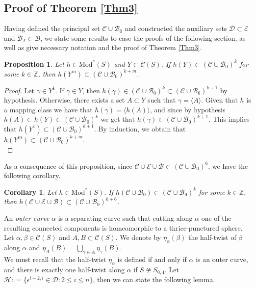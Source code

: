 \documentclass[twoside,11pt,a4paper]{article}
\newtheorem{Prop}[Def]{Proposition}
\newtheorem{Cor}[Def]{Corollary}
\newcommand*{\ccomp}[1]{\mathcal{C}(#1)}
\newcommand*{\EMod}[1]{\mathrm{Mod}^{*}(#1)}
\newcommand*{\Cf}{\mathscr{C}}
\newcommand*{\Bf}{\mathscr{B}}
\newcommand*{\Df}{\mathscr{D}}
\newcommand*{\Ef}{\mathscr{E}}
\newcommand*{\Hff}{\mathscr{H}}
\newcommand*{\ColonEqq}{\mathrel{\mathop:}=}
\begin{document}
\subsection{Proof of Theorem \ref{Thm3}}\label{chap2sec3}
\indent Having defined the principal set $\Cf \cup \Bf_{0}$ and constructed the auxiliary sets $\Df \subset \Ef$ and $\Bf_{T} \subset \Bf$, we state some results to ease the proofs of the following section, as well as give necessary notation and the proof of Theorem \ref{Thm3}.
\begin{Prop}\label{OnlyCUB0}
 Let $h \in \EMod{S}$ and $Y \subset \ccomp{S}$. If $h(Y) \subset (\Cf \cup \Bf_{0})^{k}$ for some $k \in \mathbb{Z}$, then $h(Y^{m}) \subset (\Cf \cup \Bf_{0})^{k+m}$.
\end{Prop}
\begin{proof}
 Let $\gamma \in Y^{1}$. If $\gamma \in Y$, then $h(\gamma) \in (\Cf \cup \Bf_{0})^{k} \subset (\Cf \cup \Bf_{0})^{k+1}$ by hypothesis. Otherwise, there exists a set $A \subset Y$ such that $\gamma = \langle A \rangle$. Given that $h$ is a mapping class we have that $h(\gamma) = \langle h(A) \rangle$, and since by hypothesis $h(A) \subset h(Y) \subset (\Cf \cup \Bf_{0})^{k}$ we get that $h(\gamma) \in (\Cf \cup \Bf_{0})^{k+1}$. This implies that $h(Y^{1}) \subset (\Cf \cup \Bf_{0})^{k+1}$. By induction, we obtain that $h(Y^{m}) \subset (\Cf \cup \Bf_{0})^{k+m}$.\\
\end{proof}
\indent As a consequence of this proposition, since $\Cf \cup \Ef \cup \Bf \subset (\Cf \cup \Bf_{0})^{6}$, we have the following corollary.
\begin{Cor}\label{CorOnlyCUB0}
 Let $h \in \EMod{S}$. If $h(\Cf \cup \Bf_{0}) \subset (\Cf \cup \Bf_{0})^{k}$ for some $k \in \mathbb{Z}$, then $h(\Cf \cup \Ef \cup \Bf) \subset (\Cf \cup \Bf_{0})^{k+6}$.
\end{Cor}
\indent An \textit{outer curve} $\alpha$ is a separating curve such that cutting along $\alpha$ one of the resulting connected components is homeomorphic to a thrice-punctured sphere. Let $\alpha, \beta \in \ccomp{S}$ and $A, B \subset \ccomp{S}$. We denote by $\eta_{\alpha}(\beta)$ the half-twist of $\beta$ along $\alpha$ and $\eta_{A}(B) = \bigcup_{\gamma \in A} \eta_{\gamma}(B)$.\\
\indent We must recall that the half-twist $\eta_{\alpha}$ is defined if and only if $\alpha$ is an outer curve, and there is exactly one half-twist along $\alpha$ if $S \ncong S_{0,4}$. Let $\Hff \ColonEqq \{\epsilon^{i-2,i} \in \Df: 2 \leq i \leq n\}$, then we can state the following lemma.
\end{document}
